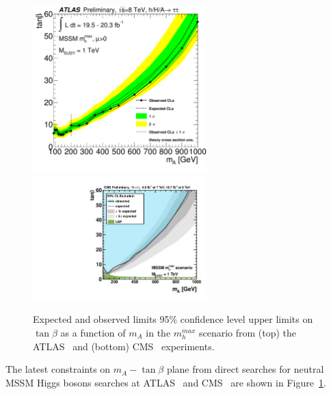 \begin{figure}[p]
     \begin{center}
            \includegraphics[width=0.6\textwidth]{figure/paper/limit_comb_2d.pdf}
            \includegraphics[width=0.6\textwidth]{figure/limits/CSM.pdf}
    \end{center}

  \caption{ Expected and observed limits 95\% confidence level upper limits on $\tan\beta$ as a function of $m_A$ 
	 in the $m_h^{max}$ scenario from (top) the ATLAS~\cite{yuppy}  and (bottom) CMS~\cite{CMSLimit} experiments.}

  \label{fig:ex2}
\end{figure}



The latest constraints on $m_A - \tan\beta$  plane from direct searches for neutral MSSM Higgs bosons searches at ATLAS~\cite{yuppy} 
and CMS~\cite{CMSLimit} are  shown in Figure~\ref{fig:ex2}. 



 




















